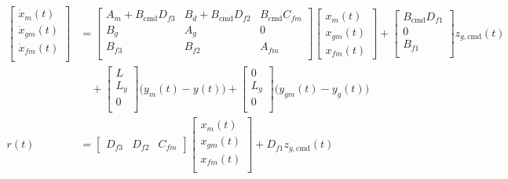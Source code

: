 \begin{equation}
  \label{eqn.refmodelcombinedwithforwardloop}
  \begin{split}
    \begin{bmatrix}
      \dot{x}_{m}(t) \\
      \dot{x}_{gm}(t) \\
      \dot{x}_{fm}(t) \\
    \end{bmatrix}
    &=
    \begin{bmatrix}
      A_{m}+B_{\text{cmd}}D_{f3} & B_{d} + B_{\text{cmd}}D_{f2} & B_{\text{cmd}}C_{fm} \\
      B_{g} & A_{g} & 0 \\
      B_{f3} & B_{f2} & A_{fm} \\
    \end{bmatrix}
    \begin{bmatrix}
      x_{m}(t) \\
      x_{gm}(t) \\
      x_{fm}(t)
    \end{bmatrix}
    +
    \begin{bmatrix}
      B_{\text{cmd}}D_{f1} \\
      0 \\
      B_{f1} \\
    \end{bmatrix} z_{g,\text{cmd}}(t) \\
    &\quad+
    \begin{bmatrix}
      L \\
      L_{y} \\
      0 \\
    \end{bmatrix}\bigr(y_{m}(t)-y(t)\bigr)
    +
    \begin{bmatrix}
      0 \\
      L_{g} \\
      0 \\
    \end{bmatrix}\bigr(y_{gm}(t)-y_{g}(t)\bigr) \\
    r(t)
    &=
    \begin{bmatrix}
      D_{f3} & D_{f2} & C_{fm}
    \end{bmatrix}
    \begin{bmatrix}
      x_{m}(t) \\
      x_{gm}(t) \\
      x_{fm}(t) \\
    \end{bmatrix}
    + D_{f1}z_{g,\text{cmd}}(t) \\
  \end{split}
\end{equation}
